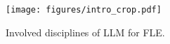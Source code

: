 \begin{figure}[tb!]
\centering
\vspace{0cm}
\texttt{[image: figures/intro\_crop.pdf]}
\caption{Involved disciplines of LLM for FLE.}
\label{fig:introduction}
\vskip -0.2in
\end{figure}
